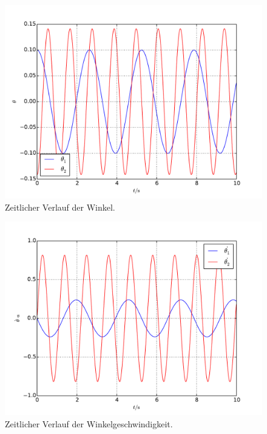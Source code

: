 \begin{figure}[h!]
	\includegraphics[width = \textwidth]{../Plots/Plot_1_C_winkel.pdf}
	\caption{Zeitlicher Verlauf der Winkel.\label{fig:winkel}}
\end{figure}

\begin{figure}[H]
	\includegraphics[width = \textwidth]{../Plots/Plot_1_C_winkelgeschwindigkeit.pdf}
	\caption{Zeitlicher Verlauf der Winkelgeschwindigkeit.\label{fig:winkelgeschwindigkeit}}
\end{figure}

\newpage
